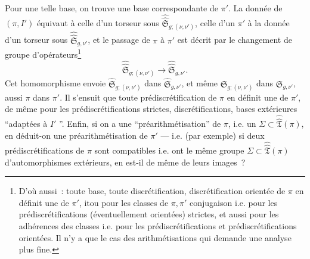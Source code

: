 Pour une telle base, on trouve une base correspondante de $\pi'$.  La donnée de $(\pi,I')$ équivaut à celle d'un torseur sous $\hat{\hat{\mathfrak{S}}}_{g;(\nu,\nu')}$, celle d'un $\pi'$ à la donnée d'un torseur sous $\hat{\hat{\mathfrak{S}}}_{g,\nu'}$, et le passage de $\pi$ à $\pi'$ est décrit par le changement de groupe d'opérateurs\footnote{D'où aussi~: toute base, toute discrétification, discrétification orientée de $\pi$ en définit une de $\pi'$, itou pour les classes de $\pi, \pi'$ conjugaison i.e. pour les prédiscrétifications (éventuellement orientées) strictes, et aussi pour les adhérences des classes i.e. pour les prédiscrétifications et prédiscrétifications orientées. Il n'y a que le cas des arithmétisations qui demande une analyse plus fine.}
$$
\hat{\hat{\mathfrak{S}}}_{g;(\nu,\nu')}\to \hat{\hat{\mathfrak{S}}}_{g,\nu'}.
$$
Cet homomorphisme envoie $\hat{\mathfrak{S}}_{g;(\nu,\nu')}$ dans $\hat{\mathfrak{S}}_{g,\nu'}$, et même $\mathfrak{S}_{g;(\nu,\nu')}$ dans $\mathfrak{S}_{g,\nu'}$, aussi $\pi$ dans $\pi'$.  Il s'ensuit que toute prédiscrétification de $\pi$ en définit une de $\pi'$, de même pour les prédiscrétifications strictes, discrétifications, bases extérieures ``adaptées à $I'$ ''. Enfin, si on a une  ``préarithmétisation'' %
de $\pi$, i.e. un $\Sigma\subset \hat{\hat{\mathfrak{T}}}(\pi)$, en déduit-on une préarithmétisation de $\pi'$ --- i.e. (par exemple) si deux prédiscrétifications de $\pi$ sont compatibles i.e. ont le même groupe $\Sigma\subset \hat{\hat{\mathfrak{T}}}(\pi)$ d'automorphismes extérieurs, en est-il de même de leurs images~?

